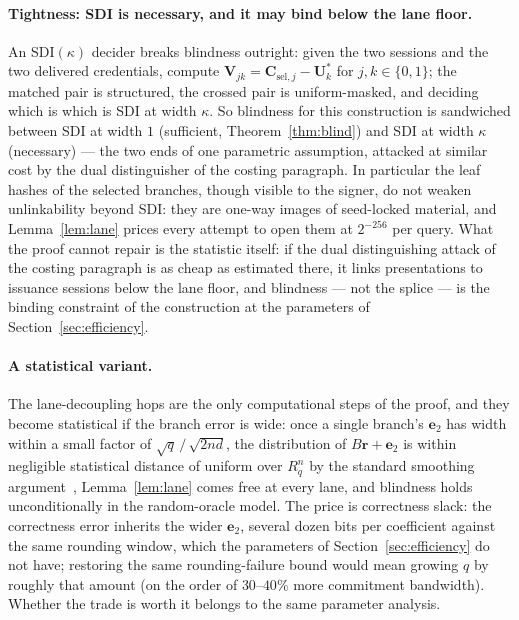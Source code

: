 \documentclass[11pt]{article}
\newcommand{\R}{R_q}
\begin{document}
\paragraph{Tightness: SDI is necessary, and it may bind below the lane
floor.}
An SDI$(\kappa)$ decider breaks blindness outright: given the two sessions
and the two delivered credentials, compute
$\mathbf V_{jk}=\mathbf C_{\mathrm{sel},j}-\mathbf U^*_k$ for
$j,k\in\{0,1\}$; the matched pair is structured, the crossed pair is
uniform-masked, and deciding which is which is SDI at width $\kappa$.  So
blindness for this construction is sandwiched between SDI at width $1$
(sufficient, Theorem~\ref{thm:blind}) and SDI at width $\kappa$ (necessary)
--- the two ends of one parametric assumption, attacked at similar cost by
the dual distinguisher of the costing paragraph.  In particular the leaf
hashes of the selected branches, though visible to the signer, do not
weaken unlinkability beyond SDI: they are one-way images of seed-locked
material, and Lemma~\ref{lem:lane} prices every attempt to open them at
$2^{-256}$ per query.  What the proof cannot repair is the statistic itself:
if the dual distinguishing attack of the costing paragraph is as cheap as
estimated there, it links presentations to issuance sessions below the
lane floor, and blindness --- not the splice --- is the binding constraint
of the construction at the parameters of Section~\ref{sec:efficiency}.

\paragraph{A statistical variant.}
The lane-decoupling hops are the only computational steps of the proof, and
they become statistical if the branch error is wide: once a single branch's
$\mathbf e_2$ has width within a small factor of $\sqrt{q}\,/\,\sqrt{2nd}$,
the distribution of $B\mathbf r+\mathbf e_2$ is within negligible
statistical distance of uniform over $\R^{n}$ by the standard smoothing
argument~\cite{MR04}, Lemma~\ref{lem:lane} comes free at every lane, and
blindness holds unconditionally in the random-oracle model.  The price is
correctness slack: the correctness error inherits the wider $\mathbf e_2$,
several dozen bits per coefficient against the same rounding window, which
the parameters of Section~\ref{sec:efficiency} do not have; restoring the
same rounding-failure bound would mean growing $q$ by roughly that amount
(on the order of $30$--$40\%$ more commitment bandwidth).  Whether the
trade is worth it belongs to the same parameter analysis.
\end{document}
